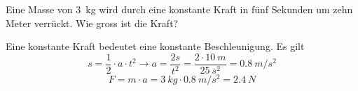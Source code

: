 
\begin{aufgabe}
Eine Masse von \SI{3}{kg} wird durch eine konstante Kraft in fünf Sekunden um zehn Meter
verrückt. Wie gross ist die Kraft? 

\begin{loesung}
	Eine konstante Kraft bedeutet eine konstante Beschleunigung. Es gilt 
	\[s=\frac{1}{2}\cdot a\cdot t^2 \to a=\frac{2s}{t^2}=\frac{2\cdot\SI{10}{m}}{\SI{25}{s^2}}=\SI{0.8}{m/s^2}\]
	\[F=m\cdot a=\SI{3}{kg}\cdot\SI{0.8}{m/s^2}=\SI{2.4}{N}\]

\end{loesung}
\end{aufgabe}
